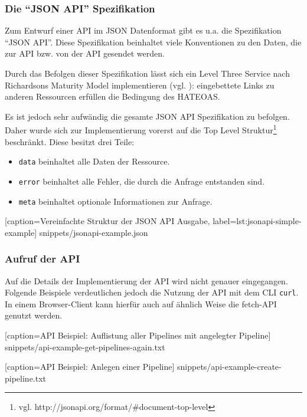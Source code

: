 \subsubsection{Die ``JSON API'' Spezifikation}
\label{subsec:jsonapi}

Zum Entwurf einer API im JSON Datenformat gibt es u.a. die Spezifikation ``JSON API''. Diese Spezifikation beinhaltet viele Konventionen zu den Daten, die zur API bzw. von der API gesendet werden.

Durch das Befolgen dieser Spezifikation lässt sich ein Level Three Service nach Richardsons Maturity Model implementieren (vgl. \citep[20]{Webber2010}): eingebettete Links zu anderen Ressourcen erfüllen die Bedingung des \ac{HATEOAS}.

Es ist jedoch sehr aufwändig die gesamte JSON API Spezifikation zu befolgen. Daher wurde sich zur Implementierung vorerst auf die Top Level Struktur\footnote{vgl. http://jsonapi.org/format/\#document-top-level} beschränkt. Diese besitzt drei Teile:

\begin{itemize}
  \item \texttt{data} beinhaltet alle Daten der Ressource.
  \item \texttt{error} beinhaltet alle Fehler, die durch die Anfrage entstanden sind.
  \item \texttt{meta} beinhaltet optionale Informationen zur Anfrage.
\end{itemize}


  [caption={Vereinfachte Struktur der JSON API Ausgabe},
  label={lst:jsonapi-simple-example}]
  {snippets/jsonapi-example.json}

\subsubsection{Aufruf der API}
\label{subsec:api-usage}

Auf die Details der Implementierung der API wird nicht genauer eingegangen. Folgende Beispiele verdeutlichen jedoch die Nutzung der API mit dem \ac{CLI} \texttt{curl}. In einem Browser-Client kann hierfür auch auf ähnlich Weise die fetch-API genutzt werden.


  [caption={API Beispiel: Auflistung aller Pipelines mit angelegter Pipeline}]
  {snippets/api-example-get-pipelines-again.txt}


  [caption={API Beispiel: Anlegen einer Pipeline}]
  {snippets/api-example-create-pipeline.txt}

